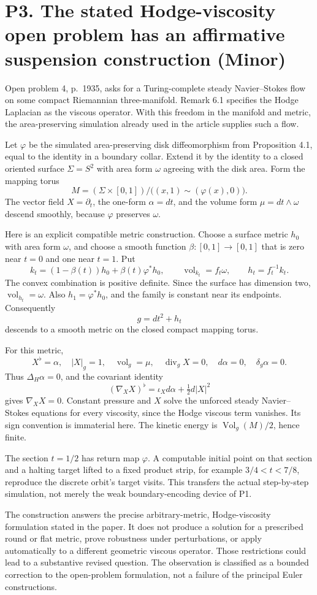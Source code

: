 \documentclass[10pt]{article}
\begin{document}
\section*{P3. The stated Hodge-viscosity open problem has an affirmative suspension construction (Minor)}
Open problem 4, p. 1935, asks for a Turing-complete steady Navier–Stokes flow on some compact Riemannian three-manifold. Remark 6.1 specifies the Hodge Laplacian as the viscous operator. With this freedom in the manifold and metric, the area-preserving simulation already used in the article supplies such a flow.\par
Let \(\varphi\) be the simulated area-preserving disk diffeomorphism from Proposition 4.1, equal to the identity in a boundary collar. Extend it by the identity to a closed oriented surface \(\Sigma=S^2\) with area form \(\omega\) agreeing with the disk area. Form the mapping torus \[M=(\Sigma\times[0,1])/\bigl((x,1)\sim(\varphi(x),0)\bigr).\] The vector field \(X=\partial_t\), the one-form \(\alpha=dt\), and the volume form \(\mu=dt\wedge\omega\) descend smoothly, because \(\varphi\) preserves \(\omega\).\par
Here is an explicit compatible metric construction. Choose a surface metric \(h_0\) with area form \(\omega\), and choose a smooth function \(\beta:[0,1]\to[0,1]\) that is zero near \(t=0\) and one near \(t=1\). Put \[k_t=(1-\beta(t))h_0+\beta(t)\varphi^*h_0,\qquad
 \operatorname{vol}_{k_t}=f_t\omega,\qquad h_t=f_t^{-1}k_t.\] The convex combination is positive definite. Since the surface has dimension two, \(\operatorname{vol}_{h_t}=\omega\). Also \(h_1=\varphi^*h_0\), and the family is constant near its endpoints. Consequently \[g=dt^2+h_t\] descends to a smooth metric on the closed compact mapping torus.\par
For this metric, \[X^\flat=\alpha,\quad |X|_g=1,\quad
 \operatorname{vol}_g=\mu,\quad
 \operatorname{div}_g X=0,\quad
 d\alpha=0,\quad \delta_g\alpha=0.\] Thus \(\Delta_H\alpha=0\), and the covariant identity \[(\nabla_X X)^\flat=\iota_Xd\alpha+\tfrac12d|X|^2\] gives \(\nabla_X X=0\). Constant pressure and \(X\) solve the unforced steady Navier–Stokes equations for every viscosity, since the Hodge viscous term vanishes. Its sign convention is immaterial here. The kinetic energy is \(\operatorname{Vol}_g(M)/2\), hence finite.\par
The section \(t=1/2\) has return map \(\varphi\). A computable initial point on that section and a halting target lifted to a fixed product strip, for example \(3/4<t<7/8\), reproduce the discrete orbit’s target visits. This transfers the actual step-by-step simulation, not merely the weak boundary-encoding device of P1.\par
The construction answers the precise arbitrary-metric, Hodge-viscosity formulation stated in the paper. It does not produce a solution for a prescribed round or flat metric, prove robustness under perturbations, or apply automatically to a different geometric viscous operator. Those restrictions could lead to a substantive revised question. The observation is classified as a bounded correction to the open-problem formulation, not a failure of the principal Euler constructions.\par
\end{document}
